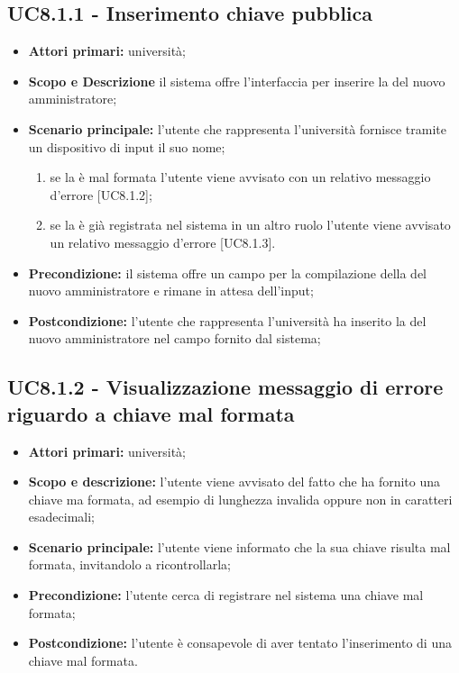 \documentclass[AnalisiDeiRequisiti.tex]{subfiles}
\begin{document}
\subsection{UC8.1.1 - Inserimento chiave pubblica}
\begin{itemize}
	\item \textbf{Attori primari:} università;\\
	\item \textbf{Scopo e Descrizione} il sistema offre l'interfaccia per inserire la  del nuovo amministratore;
	\item \textbf{Scenario principale:} l'utente che rappresenta l'università fornisce tramite un dispositivo di input il suo nome;	\begin{enumerate}
		\item se la  è mal formata l'utente viene avvisato con un relativo messaggio d'errore [UC8.1.2];
		\item se la  è già registrata nel sistema in un altro ruolo l'utente viene avvisato un relativo messaggio d'errore [UC8.1.3].
	\end{enumerate}
	\item \textbf{Precondizione:} il sistema offre un campo per la compilazione della  del nuovo amministratore e rimane in attesa dell'input;
	\item \textbf{Postcondizione:} l'utente che rappresenta l'università ha inserito la  del nuovo amministratore nel campo fornito dal sistema;
\end{itemize}
\subsection{UC8.1.2 - Visualizzazione messaggio di errore riguardo a chiave mal formata}
\begin{itemize}
	\item \textbf{Attori primari:} università;\\
	\item \textbf{Scopo e descrizione:} l'utente viene avvisato del fatto che ha fornito una chiave ma formata, ad esempio di lunghezza invalida oppure non in caratteri esadecimali;\\
	\item \textbf{Scenario principale:} l'utente viene informato che la sua chiave risulta mal formata, invitandolo a ricontrollarla;\\
	\item \textbf{Precondizione:} l'utente cerca di registrare nel sistema una chiave mal formata;\\
	\item \textbf{Postcondizione:} l'utente è consapevole di aver tentato l'inserimento di una chiave mal formata.\\
\end{itemize}
\end{document}
